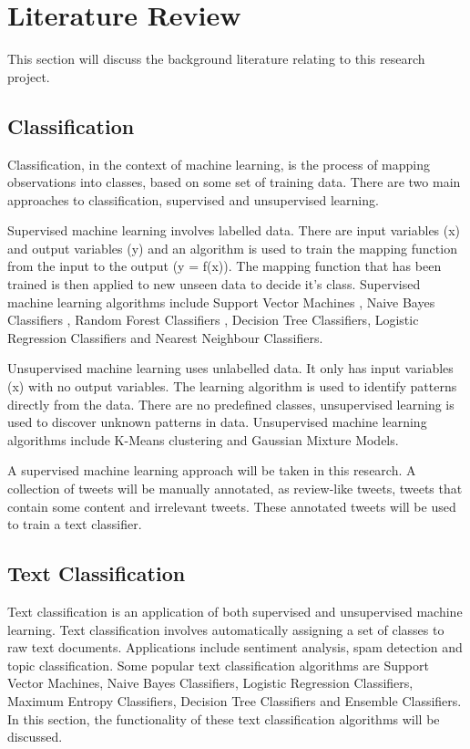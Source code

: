 \chapter{Literature Review}

This section will discuss the background literature relating to this research project.

\section{Classification}

Classification, in the context of machine learning, is the process of mapping observations into classes, based on some set of training data. There are two main approaches to classification, supervised and unsupervised learning. 

Supervised machine learning \cite{supervised2007} involves labelled data. There are input variables (x) and output variables (y) and an algorithm is used to train the mapping function from the input to the output (y = f(x)). The mapping function that has been trained is then applied to new unseen data to decide it's class. Supervised machine learning algorithms include Support Vector Machines \cite{Vapnik1995,Vapnik21995}, Naive Bayes Classifiers \cite{NaiveBayes1998}, Random Forest Classifiers \cite{Breiman2001}, Decision Tree Classifiers, Logistic Regression Classifiers and Nearest Neighbour Classifiers.

Unsupervised machine learning uses unlabelled data. It only has input variables (x) with no output variables. The learning algorithm is used to identify patterns directly from the data. There are no predefined classes, unsupervised learning is used to discover unknown patterns in data. Unsupervised machine learning algorithms include K-Means clustering and Gaussian Mixture Models. 

A supervised machine learning approach will be taken in this research. A collection of tweets will be manually annotated, as review-like tweets, tweets that contain some content and irrelevant tweets. These annotated tweets will be used to train a text classifier.

\section{Text Classification}

Text classification \cite{khan2010} is an application of both supervised and unsupervised machine learning. Text classification involves automatically assigning a set of classes to raw text documents. Applications include sentiment analysis, spam detection and topic classification. Some popular text classification algorithms are Support Vector Machines, Naive Bayes Classifiers, Logistic Regression Classifiers, Maximum Entropy Classifiers, Decision Tree Classifiers and Ensemble Classifiers. In this section, the functionality of these text classification algorithms will be discussed.

